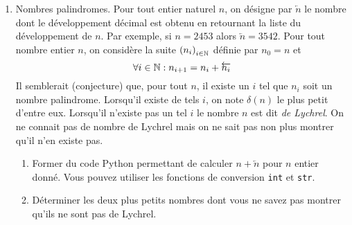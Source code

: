 \begin{enumerate}
\item Nombres palindromes.\newline
Pour tout entier naturel $n$, on désigne par $\overleftarrow{n}$ le nombre dont le développement décimal est obtenu en retournant la liste du développement de $n$. Par exemple, si $n = 2453$ alors $\overleftarrow{n}=3542$.\newline
Pour tout nombre entier $n$, on considère la suite $\left( n_i \right)_{i\in\mathbb{N}}$ définie par $n_0 = n$ et 
\begin{displaymath}
  \forall i\in \mathbb{N} : n_{i+1} = n_i + \overleftarrow{n_i}
\end{displaymath}
Il semblerait (conjecture) que, pour tout $n$, il existe un $i$ tel que $n_i$ soit un nombre palindrome. Lorsqu'il existe de tels $i$, on note $\delta(n)$ le plus petit d'entre eux. Lorsqu'il n'existe pas un tel $i$ le nombre $n$ est dit \emph{de Lychrel}. On ne connait pas de nombre de Lychrel mais on ne sait pas non plus montrer qu'il n'en existe pas.
\begin{enumerate}
  \item Former du code Python permettant de calculer $n+\overleftarrow{n}$ pour $n$ entier donné. Vous pouvez utiliser les fonctions de conversion \texttt{int} et \texttt{str}.
  \item Déterminer les deux plus petits nombres dont vous ne savez pas montrer qu'ils ne sont pas de Lychrel.
\end{enumerate}

\end{enumerate}
